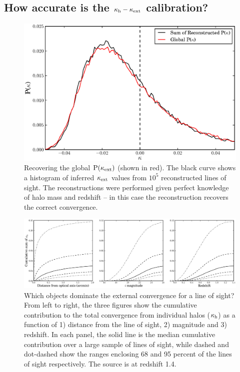 \documentclass[useAMS,usenatbib,a4paper]{mn2e}
\begin{document}

\subsection{How accurate is the $\kappa_{\rm h} - \kappa_{\rm ext}$ calibration?}

\begin{figure}
\includegraphics[width=\columnwidth]{figs/globaldist.eps}
\caption[magcut]{Recovering the global ${\rm P}(\kappa_{\rm ext})$ (shown in red). The
black curve shows a histogram of  inferred  $\kappa_{\rm ext}$ values from $10^{5}$
reconstructed lines of sight.  The reconstructions were performed given
perfect knowledge of halo mass and redshift -- in this case the reconstruction
recovers the correct convergence.}
\label{fig:globaldist}
\end{figure}

\begin{figure}
\includegraphics[width=\textwidth]{figs/where_is_the_kappa.eps}
\caption[magcut]{Which objects dominate the external convergence for a line of
sight? From left to right, the three figures show the cumulative contribution
to the total convergence from individual halos ($\kappa_{\rm h}$) as a function of
1) distance from the line of sight, 2) magnitude and 3) redshift.   In each
panel, the solid line is the median cumulative contribution over a large
sample of lines of sight, while dashed and dot-dashed show the ranges enclosing 68
and 95 percent of the lines of sight respectively. The source is at redshift 1.4.}
\label{fig:where}
\end{figure}
\end{document}
